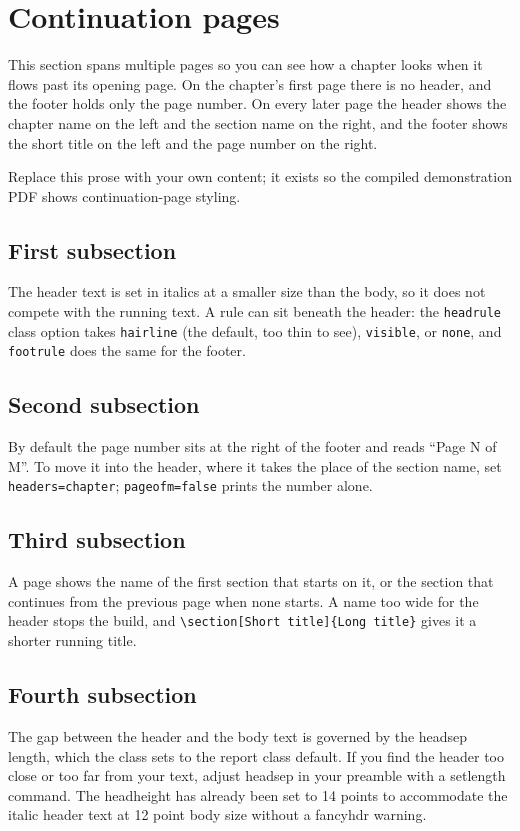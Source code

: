 \section{Continuation pages}
This section spans multiple pages so you can see how a chapter looks when it flows past its opening page. On the chapter's first page there is no header, and the footer holds only the page number. On every later page the header shows the chapter name on the left and the section name on the right, and the footer shows the short title on the left and the page number on the right.

Replace this prose with your own content; it exists so the compiled demonstration PDF shows continuation-page styling.

\subsection{First subsection}
The header text is set in italics at a smaller size than the body, so it does not compete with the running text. A rule can sit beneath the header: the \texttt{headrule} class option takes \texttt{hairline} (the default, too thin to see), \texttt{visible}, or \texttt{none}, and \texttt{footrule} does the same for the footer.

\subsection{Second subsection}
By default the page number sits at the right of the footer and reads ``Page N of M''. To move it into the header, where it takes the place of the section name, set \texttt{headers=chapter}; \texttt{pageofm=false} prints the number alone.

\subsection{Third subsection}
A page shows the name of the first section that starts on it, or the section that continues from the previous page when none starts. A name too wide for the header stops the build, and \texttt{\textbackslash section[Short title]\{Long title\}} gives it a shorter running title.

\subsection{Fourth subsection}
The gap between the header and the body text is governed by the headsep length, which the class sets to the report class default. If you find the header too close or too far from your text, adjust headsep in your preamble with a setlength command. The headheight has already been set to 14 points to accommodate the italic header text at 12 point body size without a fancyhdr warning.

